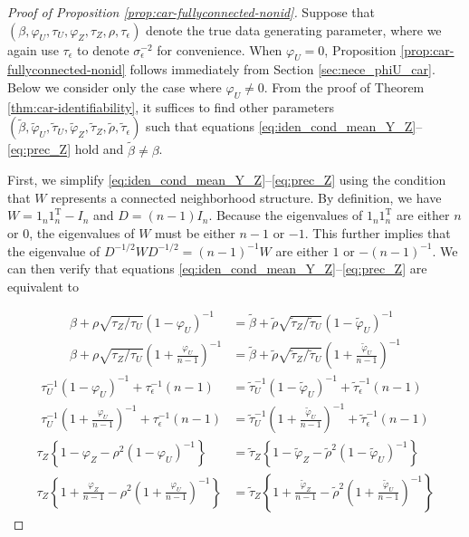 \documentclass[10pt,a4paper]{amsart}
\def\top{{ \mathrm{\scriptscriptstyle T} }}
\begin{document}
\begin{proof}[Proof of Proposition \ref{prop:car-fullyconnected-nonid}]
Suppose that $(\beta, \varphi_U, \tau_U, \varphi_Z, \tau_Z, \rho, \tau_\epsilon)$ denote the true data generating parameter, where we again use $\tau_{\epsilon}$ to denote $\sigma_{\epsilon}^{-2}$ for convenience. 
When $\varphi_U = 0$, Proposition \ref{prop:car-fullyconnected-nonid} follows immediately from Section \ref{sec:nece_phiU_car}. 
Below we consider only the case where $\varphi_U \ne 0$. 
From the proof of Theorem \ref{thm:car-identifiability}, it suffices to find other parameters $(\tilde\beta, \tilde\varphi_U, \tilde\tau_U, \tilde\varphi_Z, \tilde\tau_Z, \tilde\rho, \tilde\tau_\epsilon)$ such that equations \eqref{eq:iden_cond_mean_Y_Z}--\eqref{eq:prec_Z} hold and $\tilde\beta \ne \beta$. 

First, we simplify \eqref{eq:iden_cond_mean_Y_Z}--\eqref{eq:prec_Z} using the condition that $W$ represents a connected neighborhood structure. 
By definition, we have $W = 1_{n} 1_{n}^\top - I_n$ and $D = (n-1)I_n$. 
Because the eigenvalues of $1_{n} 1_{n}^\top$ are either $n$ or $0$, 
the eigenvalues of $W$ must be either $n-1$ or $-1$. 
This further implies that the eigenvalue of $D^{-1/2}WD^{-1/2} = (n-1)^{-1} W$ are either $1$ or $-(n-1)^{-1}$. 
We can then verify that equations \eqref{eq:iden_cond_mean_Y_Z}--\eqref{eq:prec_Z}  are equivalent to 

\begin{align}
\beta + \rho\sqrt{\tau_Z/\tau_U}(1-\varphi_U)^{-1} &= \tilde\beta + \tilde\rho\sqrt{\tilde\tau_Z/\tilde\tau_U}(1-\tilde\varphi_U)^{-1}\label{eq:fullyconnected-exp-product-1} \\
\beta + \rho\sqrt{\tau_Z/\tau_U}\left(1+\frac{\varphi_U}{n-1}\right)^{-1} &= \tilde\beta + \tilde\rho\sqrt{\tilde\tau_Z/\tilde\tau_U}\left(1+\frac{\tilde\varphi_U}{n-1}\right)^{-1}\label{eq:fullyconnected-exp-product-n-1} 
\end{align}
\begin{align}
\tau_U^{-1}(1-\varphi_U)^{-1} + \tau_\epsilon^{-1} (n-1) &= \tilde\tau_U^{-1}(1-\tilde\varphi_U)^{-1} + \tilde\tau_\epsilon^{-1}(n-1)\label{eq:fullyconnected-condvar-1} \\
\tau_U^{-1}\left(1+\frac{\varphi_U}{n-1}\right)^{-1}  + \tau_\epsilon^{-1} (n-1) &= \tilde\tau_U^{-1}\left(1+\frac{\tilde\varphi_U}{n-1}\right)^{-1}  + \tilde\tau_\epsilon^{-1}(n-1)\label{eq:fullyconnected-condvar-n-1} 
\end{align}
\begin{align}
\tau_Z\left\{1 - \varphi_Z - \rho^2(1-\varphi_U)^{-1}\right\} &= \tilde\tau_Z\left\{1 - \tilde\varphi_Z - \tilde\rho^2(1-\tilde\varphi_U)^{-1}\right\}\label{eq:fullyconnected-precision-1} \\
\tau_Z\left\{1 + \frac{\varphi_Z}{n-1} - \rho^2\left(1+\frac{\varphi_U}{n-1}\right)^{-1}\right\} &= \tilde\tau_Z\left\{1 + \frac{\tilde\varphi_Z}{n-1} - \tilde\rho^2\left(1+\frac{\tilde\varphi_U}{n-1}\right)^{-1}\right\}\label{eq:fullyconnected-precision-n-1} 
\end{align}




\end{proof}
\end{document}
